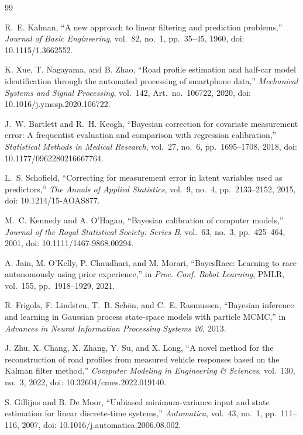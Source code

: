 \documentclass[letterpaper,10pt,journal,twocolumn]{ieeeconf}
\begin{document}
\begin{thebibliography}{99}

R.~E. Kalman, ``A new approach to linear filtering and prediction
problems,'' \emph{Journal of Basic Engineering}, vol.~82, no.~1,
pp.~35--45, 1960, doi: 10.1115/1.3662552.

K. Xue, T. Nagayama, and B. Zhao, ``Road profile estimation and
half-car model identification through the automated processing of
smartphone data,'' \emph{Mechanical Systems and Signal Processing},
vol.~142, Art.~no.~106722, 2020,
doi: 10.1016/j.ymssp.2020.106722.

J.~W. Bartlett and R.~H. Keogh, ``Bayesian correction for covariate
measurement error: A frequentist evaluation and comparison with
regression calibration,'' \emph{Statistical Methods in Medical Research},
vol.~27, no.~6, pp.~1695--1708, 2018,
doi: 10.1177/0962280216667764.

L.~S. Schofield, ``Correcting for measurement error in latent variables
used as predictors,'' \emph{The Annals of Applied Statistics}, vol.~9,
no.~4, pp.~2133--2152, 2015, doi: 10.1214/15-AOAS877.

M.~C. Kennedy and A. O'Hagan, ``Bayesian calibration of computer
models,'' \emph{Journal of the Royal Statistical Society: Series B},
vol.~63, no.~3, pp.~425--464, 2001,
doi: 10.1111/1467-9868.00294.

A. Jain, M. O'Kelly, P. Chaudhari, and M. Morari, ``BayesRace:
Learning to race autonomously using prior experience,'' in
\emph{Proc. Conf. Robot Learning}, PMLR, vol.~155,
pp.~1918--1929, 2021.

R. Frigola, F. Lindsten, T.~B. Sch\"on, and C.~E. Rasmussen,
``Bayesian inference and learning in Gaussian process state-space
models with particle MCMC,'' in \emph{Advances in Neural Information
Processing Systems 26}, 2013.

J. Zhu, X. Chang, X. Zhang, Y. Su, and X. Long, ``A novel method for
the reconstruction of road profiles from measured vehicle responses
based on the Kalman filter method,'' \emph{Computer Modeling in
Engineering \& Sciences}, vol.~130, no.~3, 2022,
doi: 10.32604/cmes.2022.019140.

S. Gillijns and B. De Moor, ``Unbiased minimum-variance input and
state estimation for linear discrete-time systems,'' \emph{Automatica},
vol.~43, no.~1, pp.~111--116, 2007,
doi: 10.1016/j.automatica.2006.08.002.


\end{thebibliography}
\end{document}
